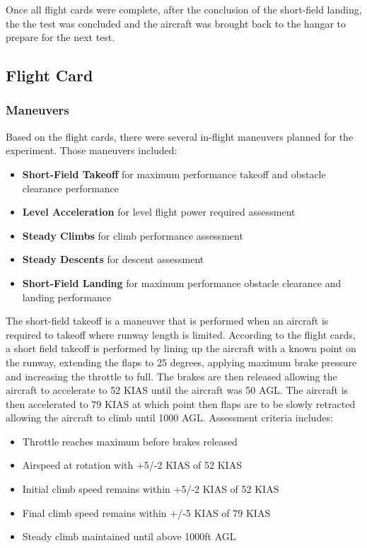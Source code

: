 \documentclass[conf]{new-aiaa}
\begin{document}
\medskip Once all flight cards were complete, after the conclusion of the short-field landing, the the test was concluded and the aircraft was brought back to the hangar to prepare for the next test.

\subsection{Flight Card}
\subsubsection{Maneuvers}
Based on the flight cards, there were several in-flight maneuvers planned for the experiment. Those maneuvers included:
\medskip
\begin{itemize}
\item \textbf{Short-Field Takeoff} for maximum performance takeoff and obstacle clearance performance
\item \textbf{Level Acceleration} for level flight power required assessment
\item \textbf{Steady Climbs} for climb performance assessment
\item \textbf{Steady Descents} for descent assessment
\item \textbf{Short-Field Landing} for maximum performance obstacle clearance and landing performance
\end{itemize}

\medskip


The short-field takeoff is a maneuver that is performed when an aircraft is required to takeoff where runway length is limited. According to the flight cards, a short field takeoff is performed by lining up the aircraft with a known point on the runway, extending the flaps to 25 degrees, applying maximum brake pressure and increasing the throttle to full. The brakes are then released allowing the aircraft to accelerate to 52 KIAS until the aircraft was 50 AGL. The aircraft is then accelerated to 79 KIAS at which point then flaps are to be slowly retracted allowing the aircraft to climb until 1000 AGL. Assessment criteria includes:

\medskip

\begin{itemize}
\item Throttle reaches maximum before brakes released
\item Airspeed at rotation with +5/-2 KIAS of 52 KIAS
\item Initial climb speed remains within +5/-2 KIAS of 52 KIAS
\item Final climb speed remains within +/-5 KIAS of 79 KIAS
\item Steady climb maintained until above 1000ft AGL
\end{itemize}
\end{document}
